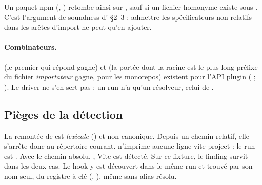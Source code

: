 \noindent Un paquet npm (, ) retombe ainsi sur , sauf si un fichier homonyme existe sous . C'est l'argument de soundness d' §2--3 : admettre les spécificateurs non relatifs dans les arêtes d'import ne peut qu'en ajouter.

\paragraph{Combinateurs.}  (le premier qui répond gagne) et  (la portée dont la racine est le plus long préfixe du fichier \emph{importateur} gagne, pour les monorepos) existent pour l'API plugin ( ; ). Le driver ne s'en sert pas : un run n'a qu'un résolveur, celui de .

\subsection{Pièges de la détection}

\begin{piege}
La remontée de  est \emph{lexicale} () et non canonique. Depuis un chemin relatif, elle s'arrête donc au répertoire courant.  n'imprime aucune ligne \og vite project\fg{} : le run est . Avec le chemin absolu, , Vite est détecté. Sur ce fixture, le finding survit dans les deux cas. Le hook y est découvert dans le même run et trouvé par son nom seul,  du registre à clé  (, ), même sans alias résolu.
\end{piege}

